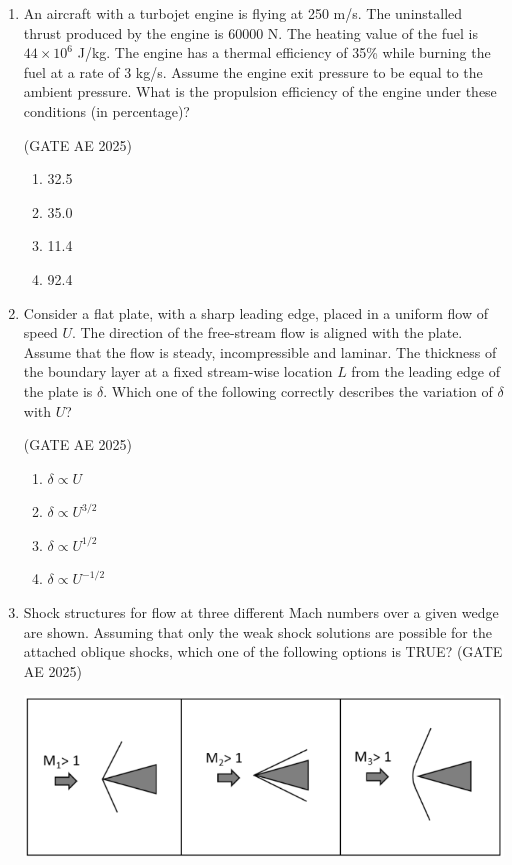 \documentclass[journal,12pt,onecolumn]{IEEEtran}
\theoremstyle{remark}
\begin{document}
\begin{flushleft}
\begin{enumerate}
\item An aircraft with a turbojet engine is flying at 250 m/s. The uninstalled thrust produced by the engine is 60000 N. The heating value of the fuel is $44 \times 10^6$ J/kg. The engine has a thermal efficiency of 35\% while burning the fuel at a rate of 3 kg/s. Assume the engine exit pressure to be equal to the ambient pressure. What is the propulsion efficiency of the engine under these conditions (in percentage)?

\hfill (GATE AE 2025)

\begin{enumerate}
    \item 32.5
    \item 35.0
    \item 11.4
    \item 92.4
\end{enumerate}

\item  Consider a flat plate, with a sharp leading edge, placed in a uniform flow of speed $U$. The direction of the free-stream flow is aligned with the plate. Assume that the flow is steady, incompressible and laminar. The thickness of the boundary layer at a fixed stream-wise location $L$ from the leading edge of the plate is $\delta$. Which one of the following correctly describes the variation of $\delta$ with $U$?  

\hfill (GATE AE 2025)

\begin{enumerate}
\item $\delta \propto U$  
\item $\delta \propto U^{3/2}$  
\item $\delta \propto U^{1/2}$  
\item $\delta \propto U^{-1/2}$ 
\end{enumerate} 


\item Shock structures for flow at three different Mach numbers over a given wedge are shown. Assuming that only the weak shock solutions are possible for the attached oblique shocks, which one of the following options is TRUE?  
\hfill (GATE AE 2025)

\begin{center}
\includegraphics[width=0.5\columnwidth]{figs/43.png}
\caption{}
    \label{fig:placeholder}
\end{center}


\end{enumerate}
\end{flushleft}
\end{document}
